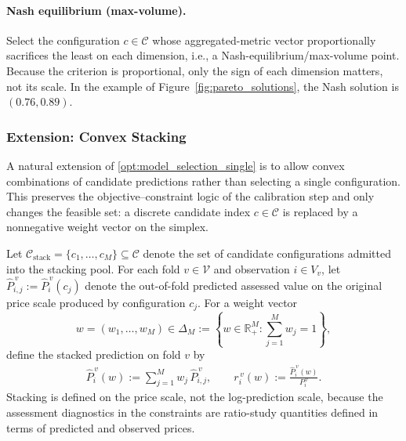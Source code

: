 \documentclass[12pt]{article}
\theoremstyle{plain}
\theoremstyle{definition}
\newcommand{\1}{\mathbf{1}}
\newcommand{\C}{\mathcal{C}}
\begin{document}
\paragraph{Nash equilibrium (max-volume).} Select the configuration $c\in\C$ whose aggregated-metric vector proportionally sacrifices the least on each dimension, i.e., a Nash-equilibrium/max-volume point. Because the criterion is proportional, only the sign of each dimension matters, not its scale. In the example of Figure~\ref{fig:pareto_solutions}, the Nash solution is $(0.76,0.89)$.



\subsubsection{Extension: Convex Stacking}
\label{subsubsec:convex_stacking}

A natural extension of \eqref{opt:model_selection_single} is to allow convex combinations of candidate predictions rather than selecting a single configuration. This preserves the objective--constraint logic of the calibration step and only changes the feasible set: a discrete candidate index $c\in\C$ is replaced by a nonnegative weight vector on the simplex.

Let $\mathcal C_{\mathrm{stack}}=\{c_1,\dots,c_M\}\subseteq\mathcal C$ denote the set of candidate configurations admitted into the stacking pool. For each fold $v\in\mathcal V$ and observation $i\in V_v$, let
$
\hat P_{i,j}^{\,v}:=\hat P_i^{\,v}(c_j)
$
denote the out-of-fold predicted assessed value on the original price scale produced by configuration $c_j$. For a weight vector
\[
w=(w_1,\dots,w_M)\in\Delta_M
:=
\left\{
w\in\mathbb R_+^M : \sum_{j=1}^M w_j = 1
\right\},
\]
define the stacked prediction on fold $v$ by
\begin{align}
    \label{eq:stacked_prediction}
    \hat P_i^{\,v}(w)
    :=
    \sum_{j=1}^M w_j\,\hat P_{i,j}^{\,v},
    \qquad
    r_i^{\,v}(w)
    :=
    \frac{\hat P_i^{\,v}(w)}{P_i^{\,v}}.
\end{align}
Stacking is defined on the price scale, not the log-prediction scale, because the assessment diagnostics in the constraints are ratio-study quantities defined in terms of predicted and observed prices.
\end{document}
